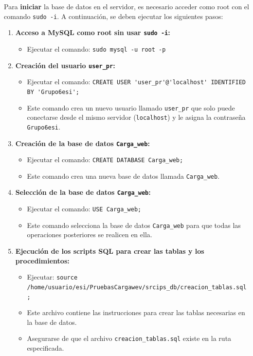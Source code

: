 \documentclass[10pt]{book}
\begin{document}
    Para \textbf{iniciar} la base de datos en el servidor, es necesario acceder como root con el comando \lstinline{sudo -i}. A continuación, se deben ejecutar los siguientes pasos:
    
    \begin{enumerate}
        \item \textbf{Acceso a MySQL como root sin usar \texttt{sudo -i}:}
        \begin{itemize}
            \item Ejecutar el comando: \lstinline{sudo mysql -u root -p}
        \end{itemize}
    
        \item \textbf{Creación del usuario \texttt{user\_pr}:}
        \begin{itemize}
            \item Ejecutar el comando: \lstinline{CREATE USER 'user_pr'@'localhost' IDENTIFIED BY 'Grupo6esi';}
            \item Este comando crea un nuevo usuario llamado \texttt{user\_pr} que solo puede conectarse desde el mismo servidor (\texttt{localhost}) y le asigna la contraseña \texttt{Grupo6esi}.
        \end{itemize}
    
        \item \textbf{Creación de la base de datos \texttt{Carga\_web}:}
        \begin{itemize}
            \item Ejecutar el comando: \lstinline{CREATE DATABASE Carga_web;}
            \item Este comando crea una nueva base de datos llamada \texttt{Carga\_web}.
        \end{itemize}
    
        \item \textbf{Selección de la base de datos \texttt{Carga\_web}:}
        \begin{itemize}
            \item Ejecutar el comando: \lstinline{USE Carga_web;}
            \item Este comando selecciona la base de datos \texttt{Carga\_web} para que todas las operaciones posteriores se realicen en ella.
        \end{itemize}
    
        \item \textbf{Ejecución de los scripts SQL para crear las tablas y los procedimientos:}
        \begin{itemize}
            \item Ejecutar: \lstinline{source /home/usuario/esi/PruebasCargawev/srcips_db/creacion_tablas.sql;}
            \item Este archivo contiene las instrucciones para crear las tablas necesarias en la base de datos.
            \item Asegurarse de que el archivo \texttt{creacion\_tablas.sql} existe en la ruta especificada.
            

\end{itemize}
\end{enumerate}
\end{document}
